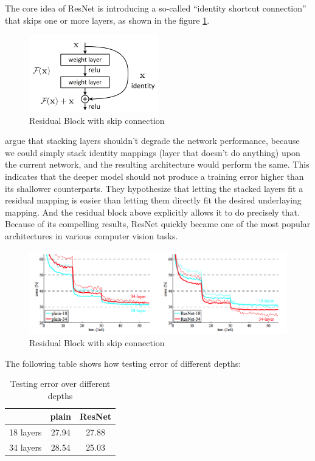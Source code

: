 \documentclass[a4paper,12pt]{report}
\begin{document}
\hspace*{0.5 in}The core idea of ResNet is introducing a so-called “identity shortcut connection” that skips one or more layers, as shown in the figure \ref{ResidualBlock}.
\begin{figure}[H]
    \centering
    \includegraphics[width=0.5\textwidth]{figures/Residual_block.png}
    \caption{Residual Block with skip connection}
    \label{ResidualBlock}
\end{figure}
\hspace*{0.5 in}\citet{He_2016} argue that stacking layers shouldn’t degrade the network performance, because we could simply stack identity mappings (layer that doesn’t do anything) upon the current network, and the resulting architecture would perform the same. This indicates that the deeper model should not produce a training error higher than its shallower counterparts. They hypothesize that letting the stacked layers fit a residual mapping is easier than letting them directly fit the desired underlaying mapping. And the residual block above explicitly allows it to do precisely that. Because of its compelling results, ResNet quickly became one of the most popular architectures in various computer vision tasks.
\begin{figure}[H]
    \centering
    \includegraphics[width=\textwidth]{figures/PlainVsResnet.png}
    \caption{Residual Block with skip connection}
    \label{PlainVsResidual}
\end{figure}
\hspace*{0.5 in}The following table shows how testing error of different depths:
\begin{table}[H]
    \centering
    \begin{tabular}{c | c c}
         & plain & ResNet \\
         \hline
        18 layers & 27.94 & 27.88\\
        34 layers & 28.54 & 25.03\\
    \end{tabular}
    \caption{Testing error over different depths}
    \label{TestPlainVsResNets}
\end{table}
\end{document}
